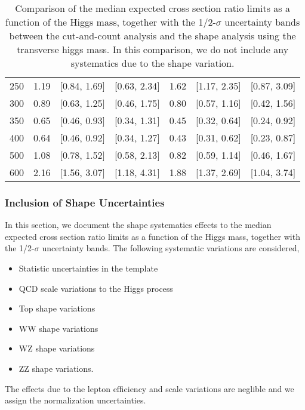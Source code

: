 \begin{table}[!ht]
\begin{center}
{\begin{tabular}{|l|c|c|c|c|c|c|}
\hline
250 & 1.19 & [0.84, 1.69] & [0.63, 2.34] & 1.62 & [1.17, 2.35] & [0.87, 3.09] \\
300 & 0.89 & [0.63, 1.25] & [0.46, 1.75] & 0.80 & [0.57, 1.16] & [0.42, 1.56] \\
350 & 0.65 & [0.46, 0.93] & [0.34, 1.31] & 0.45 & [0.32, 0.64] & [0.24, 0.92] \\
400 & 0.64 & [0.46, 0.92] & [0.34, 1.27] & 0.43 & [0.31, 0.62] & [0.23, 0.87]\\
500 & 1.08 & [0.78, 1.52] & [0.58, 2.13] & 0.82 & [0.59, 1.14] & [0.46, 1.67] \\
600 & 2.16 & [1.56, 3.07] & [1.18, 4.31] & 1.88 & [1.37, 2.69] & [1.04, 3.74]\\
\hline
\end{tabular}
}
\caption{Comparison of the median expected cross section ratio limits as a function 
of the Higgs mass, together with the 1/2-$\sigma$ uncertainty bands between the cut-and-count 
analysis and the shape analysis using the transverse higgs mass. 
In this comparison, we do not include any systematics due to the shape variation. }
\label{tab:mvashape_mevsbdt_hzz}
\end{center}
\end{table}

\subsubsection{Inclusion of Shape Uncertainties}

In this section, we document the shape systematics effects to the median expected cross section 
ratio limits as a function of the Higgs mass, together with the 1/2-$\sigma$ uncertainty bands. 
The following systematic variations are considered,
\begin{itemize}
\item {Statistic uncertainties in the template}
\item {QCD scale variations to the Higgs process}
\item {Top shape variations}
\item {WW shape variations}
\item {WZ shape variations}
\item {ZZ shape variations}.
\end{itemize}
The effects due to the lepton efficiency and scale variations are neglible and we assign 
the normalization uncertainties. 

